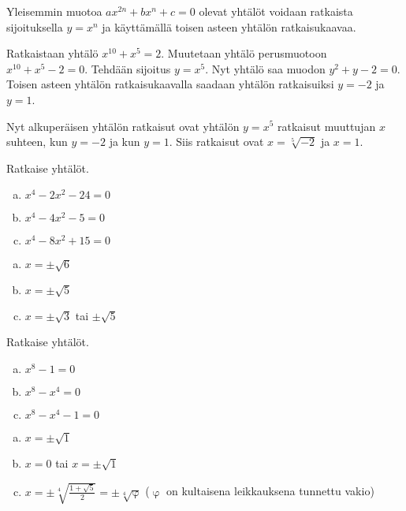 Yleisemmin muotoa $ax^{2n}+bx^n+c=0$ olevat yhtälöt voidaan ratkaista sijoituksella $y = x^n$ ja käyttämällä toisen asteen yhtälön ratkaisukaavaa.

\begin{esimerkki}
Ratkaistaan yhtälö $x^{10}+x^5=2$. Muutetaan yhtälö perusmuotoon $x^{10}+x^5-2=0$. Tehdään sijoitus $y = x^5$. Nyt yhtälö saa muodon $y^2+y-2 = 0$. Toisen asteen yhtälön ratkaisukaavalla saadaan yhtälön ratkaisuiksi $y = -2$ ja $y = 1$.

Nyt alkuperäisen yhtälön ratkaisut ovat yhtälön $y = x^5$ ratkaisut muuttujan $x$ suhteen, kun $y = -2$ ja kun $y = 1$. Siis ratkaisut ovat $x = \sqrt[5]{-2}$ ja $x = 1$.
\end{esimerkki}

\Harjoitustehtavat

\begin{tehtava}
    Ratkaise yhtälöt.
    \begin{enumerate}[a)]
        \item $x^4 - 2x^2 - 24 = 0$
        \item $x^4 - 4x^2 - 5 = 0$
        \item $x^4 - 8x^2 + 15 = 0$
    \end{enumerate}
    \begin{vastaus}
        \begin{enumerate}[a)]
            \item $x = \pm\sqrt{6}$
            \item $x = \pm\sqrt{5}$
            \item $x = \pm\sqrt{3}$ tai $\pm\sqrt{5}$
        \end{enumerate}
    \end{vastaus}
\end{tehtava}

\begin{tehtava}
    Ratkaise yhtälöt.
    \begin{enumerate}[a)]
        \item $x^8 - 1 = 0$
        \item $x^8 - x^4 = 0$
        \item $x^8 - x^4 - 1 = 0$
    \end{enumerate}
    \begin{vastaus}
        \begin{enumerate}[a)]
            \item $x = \pm\sqrt{1}$
            \item $x = 0$ tai $x = \pm\sqrt{1}$
            \item $x = \pm\sqrt[4]{\frac{1+\sqrt{5}}{2}} = \pm\sqrt[4]{\upvarphi}$ ($\upvarphi$ on kultaisena leikkauksena tunnettu vakio)
        \end{enumerate}
    \end{vastaus}
\end{tehtava}

